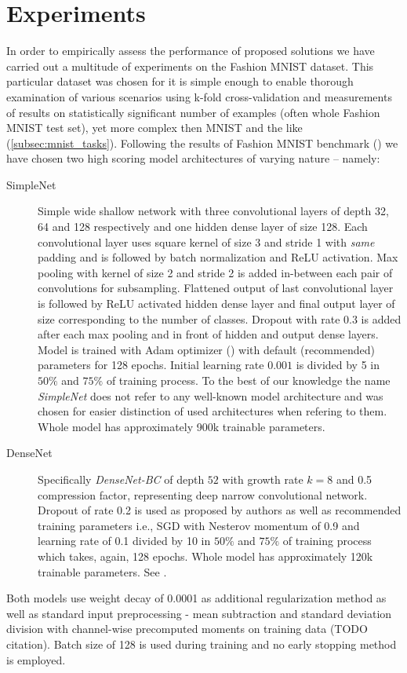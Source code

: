 \chapter{Experiments}
\label{sec:experiments}
In order to empirically assess the performance of proposed solutions we have carried out a multitude of experiments on the Fashion MNIST dataset. This particular dataset was chosen for it is simple enough to enable thorough examination of various scenarios using k-fold cross-validation and measurements of results on statistically significant number of examples (often whole Fashion MNIST test set), yet more complex then MNIST and the like (\ref{subsec:mnist_tasks}). Following the results of Fashion MNIST benchmark (\cite{FASHION_BENCH}) we have chosen two high scoring model architectures of varying nature -- namely:

\begin{description}
    \item[SimpleNet]
Simple wide shallow network with three convolutional layers of depth 32, 64 and 128 respectively and one hidden dense layer of size 128. Each convolutional layer uses square kernel of size 3 and stride 1 with \textit{same} padding and is followed by batch normalization and ReLU activation. Max pooling with kernel of size 2 and stride 2 is added in-between each pair of convolutions for subsampling. Flattened output of last convolutional layer is followed by ReLU activated hidden dense layer and final output layer of size corresponding to the number of classes. Dropout with rate $0.3$ is added after each max pooling and in front of hidden and output dense layers. Model is trained with Adam optimizer (\cite{DBLP:journals/corr/KingmaB14}) with default (recommended) parameters for 128 epochs. Initial learning rate $0.001$ is divided by 5 in $50\%$ and $75\%$ of training process. To the best of our knowledge the name \textit{SimpleNet} does not refer to any well-known model architecture and was chosen for easier distinction of used architectures when refering to them. Whole model has approximately 900k trainable parameters.
    \item[DenseNet]
Specifically \textit{DenseNet-BC} of depth $52$ with growth rate $k=8$ and 0.5 compression factor, representing deep narrow convolutional network. Dropout of rate 0.2 is used as proposed by authors as well as recommended training parameters i.e., SGD with Nesterov momentum of 0.9 and learning rate of 0.1 divided by 10 in $50\%$ and $75\%$ of training process which takes, again, 128 epochs. Whole model has approximately 120k trainable parameters. See \cite{DBLP:journals/corr/HuangLW16a}.
\end{description}
Both models use weight decay of 0.0001 as additional regularization method as well as standard input preprocessing - mean subtraction and standard deviation division with channel-wise precomputed moments on training data (TODO citation). Batch size of 128 is used during training and no early stopping method is employed.

